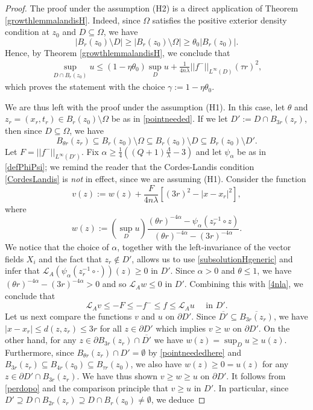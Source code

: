 \documentclass[12pt]{amsart}
\def \L {\mathcal{L}}
\def \O {\Omega}
\def \a {\alpha}
\def \t {\tau}
\begin{document}
\begin{proof} The proof under the assumption (H2) is a direct application of Theorem  \ref{growthlemmalandisH}. Indeed, since $\O$ satisfies the positive exterior density condition at $z_0$ and $D\subseteq \O$, we have
$$
|B_r(z_0) \setminus D|\geq |B_r(z_0) \setminus \O|\geq \theta_0 |B_r(z_0)|.
$$
Hence, by Theorem  \ref{growthlemmalandisH}, we conclude that
\begin{align*}
\sup_{D \cap B_r(z_0)} u\leq \left(1 - \eta \theta_0 \right)\sup_D u + \frac{1}{4n\lambda}||f^-||_{L^{\infty}(D)} (\tau r)^2,
\end{align*}
which proves the statement with the choice $\gamma:=1 - \eta \theta_0$.

We are thus left with the proof under the assumption {\rm{(H1)}}. In this case, let $\theta$ and $z_r=(x_r,t_r)\in B_r(z_0) \setminus \O$ be as in \eqref{pointneeded}. If we let $D':=D\cap B_{3r}(z_r)$, then since $D\subseteq \O$, we have
\begin{equation}\label{pointneededhere}
 B_{\theta r}(z_r)\subseteq B_r(z_0) \setminus \O\subseteq B_r(z_0) \setminus D \subseteq B_r(z_0) \setminus D'.
\end{equation}
Let $F = ||f^-||_{L^{\infty}(D')}$. Fix $\a\geq \frac{1}{4}\left( (Q+1)\frac{\Lambda}{\lambda} - 3\right)$ and let $\psi_{\a}$ be as in \eqref{defPhiPsi}; we remind the reader that the Cordes-Landis condition \eqref{CordesLandis} is \emph{not} in effect, since we are assuming (H1). Consider the function
$$v(z) := w(z) + \frac{F}{4n\lambda}\left[(3r)^2 - |x - x_r|^2 \right],$$
where
$$
w(z):=\left(\sup_D u \right) \frac{(\theta r)^{-4\a}-\psi_\a(z_r^{-1}\circ z)}{(\theta r)^{-4\a}-(3 r)^{-4\a}}.
$$
We notice that the choice of $\a$, together with the left-invariance of the vector fields $X_i$ and the fact that $z_r\notin D'$, allows us to use \eqref{subsolutionHgeneric} and infer that $\L_A( \psi_\a(z_r^{-1}\circ \cdot))(z)\geq 0$ in $D'$. Since $\a>0$ and $\theta\leq 1$, we have $(\theta r)^{-4\a}-(3 r)^{-4\a} > 0$ and so $\L_A w\leq 0$ in $D'$. Combining this with \eqref{4nla}, we conclude that
\begin{equation}\label{perdopo}
\L_A v \leq -F \leq -f^-\leq  f\leq \L_A u \quad\mbox{ in }D'.
\end{equation}
Let us next compare the functions $v$ and $u$ on $\partial D'$. Since $\overline{D'}\subseteq \overline{B_{3 r}(z_r)}$, we have $|x-x_r|\leq d(z,z_r)\leq 3r$ for all $z\in\partial D'$ which implies $v\geq w$ on $\partial D'$. On the other hand, for any $z\in\partial B_{3 r}(z_r) \cap \overline{D'}$ we have $w(z)=\sup_D u \geq u(z)$. Furthermore, since $B_{\theta r}(z_r)\cap D'=\emptyset$ by \eqref{pointneededhere} and $B_{3 r}(z_r)\subseteq B_{4 r}(z_0)\subseteq B_{\t r}(z_0)$, we also have $w(z)\geq 0=u(z)$ for any $z\in \partial D'\cap B_{3 r}(z_r)$. We have thus shown $v\geq w\geq u$ on $\partial D'$. It follows from \eqref{perdopo} and the comparison principle that $v\geq u$ in $D'$. In particular, since $D'\supseteq D\cap B_{2r}(z_r)\supseteq D\cap B_{r}(z_0)\neq \emptyset$, we deduce

\end{proof}
\end{document}
